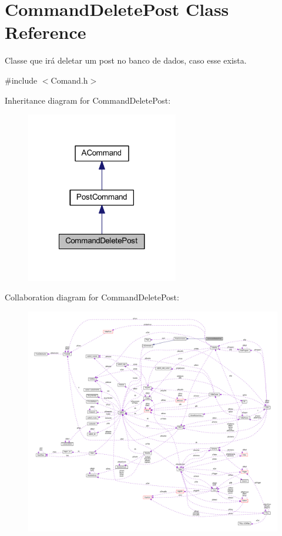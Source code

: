 \hypertarget{class_command_delete_post}{\section{Command\-Delete\-Post Class Reference}
\label{class_command_delete_post}
}


Classe que irá deletar um post no banco de dados, caso esse exista.  




{\ttfamily \#include $<$Comand.\-h$>$}



Inheritance diagram for Command\-Delete\-Post\-:\nopagebreak
\begin{figure}[H]
\begin{center}
\leavevmode
\includegraphics[width=188pt]{class_command_delete_post__inherit__graph}
\end{center}
\end{figure}


Collaboration diagram for Command\-Delete\-Post\-:\nopagebreak
\begin{figure}[H]
\begin{center}
\leavevmode
\includegraphics[width=350pt]{class_command_delete_post__coll__graph}
\end{center}
\end{figure}

